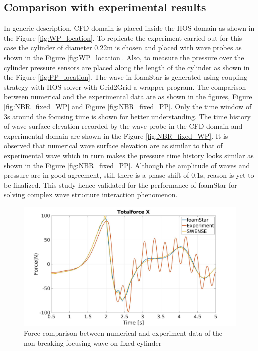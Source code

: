 \documentclass[preprint,12pt]{article}
\begin{document}
{\subsection{Comparison with experimental results}
In generic description, CFD domain is placed inside the HOS domain as shown in the Figure \ref{fig:WP_location}. To replicate the experiment carried out for this case the cylinder of diameter 0.22m is chosen and placed with wave probes as shown in the Figure \ref{fig:WP_location}. Also, to measure the pressure over the cylinder pressure sensors are placed along the length of the cylinder as shown in the Figure \ref{fig:PP_location}. The wave in foamStar is generated using coupling strategy with HOS solver with Grid2Grid a wrapper program\cite{choi_relaxation}. The comparison between numerical and the experimental data are as shown in the figures, Figure \ref{fig:NBR_fixed_WP} and Figure \ref{fig:NBR_fixed_PP}. Only the time window of 3s around the focusing time is shown for better understanding. The time history of wave surface elevation recorded by the wave probe in the CFD domain and experimental domain are shown in the Figure \ref{fig:NBR_fixed_WP}. It is observed that numerical wave surface elevation are as similar to that of experimental wave which in turn makes the pressure time history looks similar as shown in the Figure \ref{fig:NBR_fixed_PP}. Although the amplitude of waves and pressure are in good agreement, still there is a phase shift of 0.1s, reason is yet to be finalized. 
This study hence validated for the performance of foamStar for solving complex wave structure interaction phenomenon. 

	\begin{figure}[H]
	\centering     %
    \includegraphics[width=\textwidth]{TotalForce.jpg}
	\caption{Force comparison between numerical and experiment data of the non breaking focusing wave on fixed cylinder }
\end{figure}





}
\end{document}
